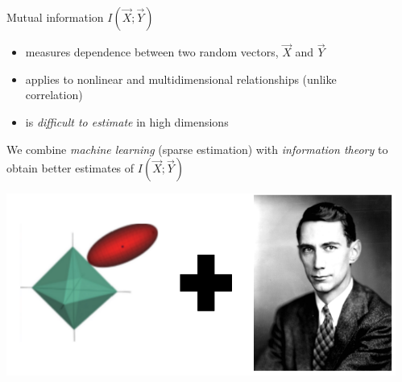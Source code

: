 \documentclass{beamer}
\begin{document}
\begin{frame}
\begin{columns}
\begin{column}{0.25\textwidth}
\end{column}
\begin{column}{0.75\textwidth}
Mutual information $I(\vec{X}; \vec{Y})$
\begin{itemize}
\item measures dependence between two random vectors, $\vec{X}$ and $\vec{Y}$ \pause
\item applies to nonlinear and multidimensional relationships (unlike correlation) \pause
\item is \emph{difficult to estimate} in high dimensions \pause
\end{itemize}
We combine \emph{machine learning} (sparse estimation) with \emph{information theory} to obtain better estimates of $I(\vec{X}; \vec{Y})$
\begin{center}
\includegraphics[scale = 0.23]{ml_shann.png}
\end{center}
\end{column}
\end{columns}
\end{frame}
\end{document}
